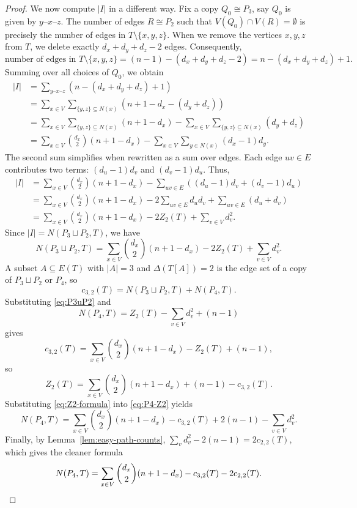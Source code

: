 \documentclass[12pt,reqno]{amsart}
\theoremstyle{definition}
\begin{document}
\begin{proof}
We now compute $|I|$ in a different way. Fix a copy $Q_0\cong P_3$, say $Q_0$ is given by $y\text{--}x\text{--}z$. The number of edges $R\cong P_2$ such that $V(Q_0)\cap V(R)=\emptyset$ is precisely the number of edges in $T\setminus \{x,y,z\}$. When we remove the vertices $x,y,z$ from $T$, we delete exactly $d_x+d_y+d_z-2$ edges. Consequently,
\[
\text{number of edges in } T\setminus \{x,y,z\}
=(n-1)-(d_x+d_y+d_z-2)=n-(d_x+d_y+d_z)+1.
\]
Summing over all choices of $Q_0$, we obtain
\begin{align*}
|I| &= \sum_{y\text{--}x\text{--}z} (n-(d_x+d_y+d_z)+1) \\
&= \sum_{x\in V} \sum_{\{y,z\}\subseteq N(x)} (n+1-d_x-(d_y+d_z)) \\
&=\sum_{x\in V}\sum_{\{y,z\}\subseteq N(x)}(n+1-d_x) - \sum_{x\in V}\sum_{\{y,z\}\subseteq N(x)} (d_y+d_z) \\
&=\sum_{x\in V} \binom{d_x}{2}(n+1-d_x) - \sum_{x\in V} \sum_{y\in N(x)} (d_x-1)d_y.
\end{align*}
The second sum simplifies when rewritten as a sum over edges. Each edge $uv \in E$ contributes two terms: $(d_u-1)d_v$ and $(d_v-1)d_u$. Thus,
\begin{align*}
|I| &= \sum_{x\in V}\binom{d_x}{2}(n+1-d_x) - \sum_{uv\in E}((d_u-1)d_v+(d_v-1)d_u) \\
&= \sum_{x\in V}\binom{d_x}{2}(n+1-d_x)-2\sum_{uv\in E} d_u d_v + \sum_{uv\in E}(d_u+d_v) \\
&= \sum_{x\in V}\binom{d_x}{2}(n+1-d_x) - 2 Z_2(T) + \sum_{v\in V} d_v^2.
\end{align*}
Since $|I|=N(P_3\sqcup P_2, T)$, we have
\begin{equation}\label{eq:P3uP2}
N(P_3\sqcup P_2, T) = \sum_{x\in V}\binom{d_x}{2}(n+1-d_x) - 2 Z_2(T) + \sum_{v\in V} d_v^2.
\end{equation}
A subset $A\subseteq E(T)$ with $|A|=3$ and $\Delta(T[A])=2$ is the edge set of a copy of $P_3\sqcup P_2$ or $P_4$, so
\[
c_{3,2}(T) = N(P_3\sqcup P_2, T) + N(P_4,T).
\]
Substituting \eqref{eq:P3uP2} and
\begin{equation}\label{eq:P4-Z2}
N(P_4, T) = Z_2(T) -\sum_{v\in V} d_v^2 + (n-1)
\end{equation}
gives
\[
c_{3,2}(T) = \sum_{x\in V} \binom{d_x}{2}(n+1-d_x) -Z_2(T) + (n-1),
\]
so
\begin{equation}\label{eq:Z2-formula}
Z_2(T) = \sum_{x\in V}\binom{d_x}{2}(n+1-d_x)+(n-1)-c_{3,2}(T).
\end{equation}
Substituting \eqref{eq:Z2-formula} into \eqref{eq:P4-Z2} yields
\[
N(P_4, T) =  \sum_{x\in V} \binom{d_x}{2}(n+1-d_x) - c_{3,2}(T) + 2(n-1) - \sum_{v\in V} d_v^2.
\]
Finally, by Lemma~\ref{lem:easy-path-counts}, $\sum_{v}d_v^2-2(n-1)=2c_{2,2}(T)$, which gives the cleaner formula
\[
N(P_4, T) = \sum_{x\in V}\binom{d_x}{2}(n+1-d_x) - c_{3,2}(T) - 2c_{2,2}(T). \qedhere
\]
\end{proof}
\end{document}

